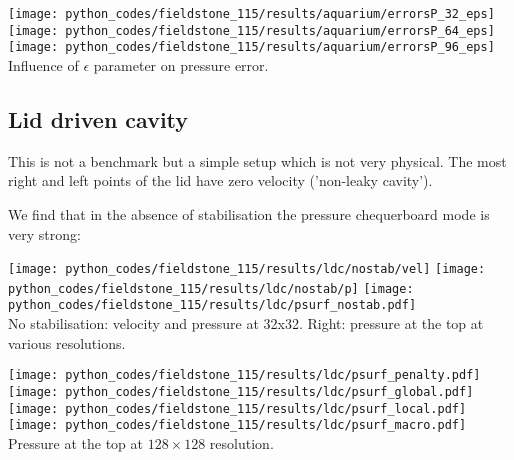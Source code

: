 \begin{center}
\texttt{[image: python\_codes/fieldstone\_115/results/aquarium/errorsP\_32\_eps]}
\texttt{[image: python\_codes/fieldstone\_115/results/aquarium/errorsP\_64\_eps]}
\texttt{[image: python\_codes/fieldstone\_115/results/aquarium/errorsP\_96\_eps]}\\
{\captionfont Influence of $\epsilon$ parameter on pressure error.}
\end{center}


\newpage
\subsection*{Lid driven cavity}

This is not a benchmark but a simple setup which is not very physical. The most right and left
points of the lid have zero velocity ('non-leaky cavity').

We find that in the absence of stabilisation the pressure chequerboard mode is 
very strong:
\begin{center}
\texttt{[image: python\_codes/fieldstone\_115/results/ldc/nostab/vel]}
\texttt{[image: python\_codes/fieldstone\_115/results/ldc/nostab/p]}
\texttt{[image: python\_codes/fieldstone\_115/results/ldc/psurf\_nostab.pdf]}\\
{\captionfont No stabilisation: velocity and pressure at 32x32. Right: 
pressure at the top at various resolutions.}
\end{center}

\begin{center}
\texttt{[image: python\_codes/fieldstone\_115/results/ldc/psurf\_penalty.pdf]}
\texttt{[image: python\_codes/fieldstone\_115/results/ldc/psurf\_global.pdf]}\\
\texttt{[image: python\_codes/fieldstone\_115/results/ldc/psurf\_local.pdf]}
\texttt{[image: python\_codes/fieldstone\_115/results/ldc/psurf\_macro.pdf]}\\
{\captionfont Pressure at the top at $128\times 128$ resolution.}
\end{center}

